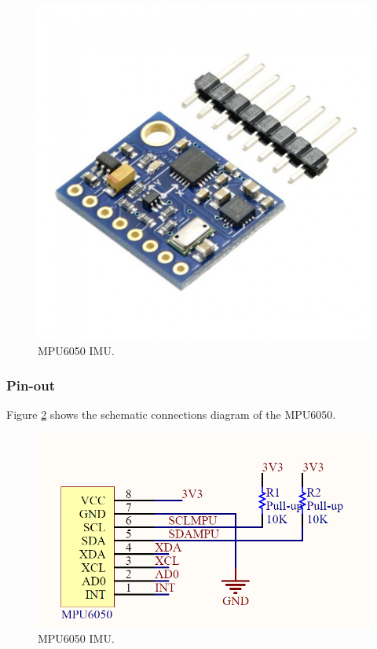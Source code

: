 \begin{figure}[H]
	\center
	\includegraphics[scale=0.2]{imagenes/Balancing_robot/IMU1}
	\caption{MPU6050 IMU.}
	\label{fig:IMU1}
\end{figure}
\subsubsection{Pin-out}

Figure \ref{fig:MPU6050_schematic} shows the schematic connections diagram of the MPU6050.

\begin{figure}[H]
	\center
	\includegraphics[scale=0.4]{imagenes/Balancing_robot/MPU6050_schematic}
	\caption{MPU6050 IMU.}
	\label{fig:MPU6050_schematic}
\end{figure}

